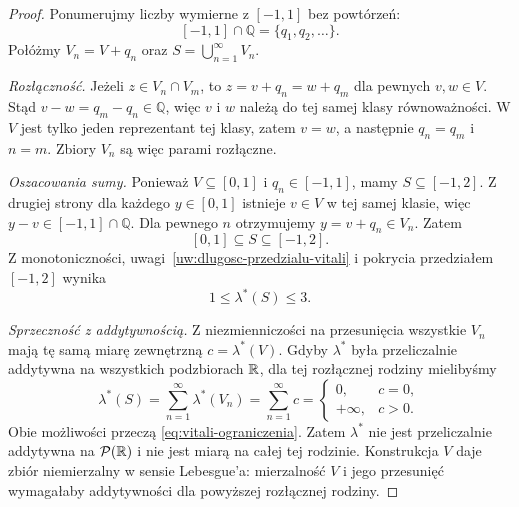 \begin{proof}
Ponumerujmy liczby wymierne z $[-1,1]$ bez powtórzeń:
\[
  [-1,1]\cap\mathbb{Q}=\{q_1,q_2,\ldots\}.
\]
Połóżmy $V_n=V+q_n$ oraz $S=\bigcup_{n=1}^{\infty}V_n$.

\emph{Rozłączność.}
Jeżeli $z\in V_n\cap V_m$, to $z=v+q_n=w+q_m$ dla pewnych $v,w\in V$.
Stąd $v-w=q_m-q_n\in\mathbb{Q}$, więc $v$ i $w$ należą do tej samej
klasy równoważności. W $V$ jest tylko jeden reprezentant tej klasy,
zatem $v=w$, a następnie $q_n=q_m$ i $n=m$.
Zbiory $V_n$ są więc parami rozłączne.

\emph{Oszacowania sumy.}
Ponieważ $V\subseteq[0,1]$ i $q_n\in[-1,1]$, mamy $S\subseteq[-1,2]$.
Z drugiej strony dla każdego $y\in[0,1]$ istnieje $v\in V$ w tej samej
klasie, więc $y-v\in[-1,1]\cap\mathbb{Q}$. Dla pewnego $n$ otrzymujemy
$y=v+q_n\in V_n$. Zatem
\[
  [0,1]\subseteq S\subseteq[-1,2].
\]
Z monotoniczności, uwagi~\ref{uw:dlugosc-przedzialu-vitali}
i pokrycia przedziałem $[-1,2]$ wynika
\begin{equation}
  1\leq\lambda^{\ast}(S)\leq3.
  \label{eq:vitali-ograniczenia}
\end{equation}

\emph{Sprzeczność z addytywnością.}
Z niezmienniczości na przesunięcia wszystkie $V_n$ mają tę samą miarę
zewnętrzną $c=\lambda^{\ast}(V)$.
Gdyby $\lambda^{\ast}$ była przeliczalnie addytywna na wszystkich
podzbiorach $\mathbb{R}$, dla tej rozłącznej rodziny mielibyśmy
\[
  \lambda^{\ast}(S)=\sum_{n=1}^{\infty}\lambda^{\ast}(V_n)
    =\sum_{n=1}^{\infty}c
    =\begin{cases}
      0, & c=0,\\
      +\infty, & c>0.
    \end{cases}
\]
Obie możliwości przeczą \eqref{eq:vitali-ograniczenia}.
Zatem $\lambda^{\ast}$ nie jest przeliczalnie addytywna na
$\mathcal{P}(\mathbb{R})$ i nie jest miarą na całej tej rodzinie.
Konstrukcja $V$ daje zbiór niemierzalny w sensie Lebesgue'a:
mierzalność $V$ i jego przesunięć wymagałaby addytywności
dla powyższej rozłącznej rodziny.
\end{proof}
